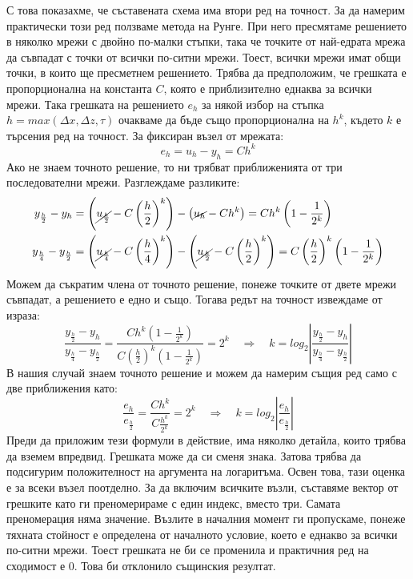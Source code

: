\documentclass[12pt]{article}
\numberwithin{equation}{section}
\begin{document}
С това показахме, че съставената схема има втори ред на точност. За да намерим практически този ред ползваме метода на Рунге. При него пресмятаме решението в няколко мрежи с двойно по-малки стъпки, така че точките от най-едрата мрежа да съвпадат с точки от всички по-ситни мрежи. Тоест, всички мрежи имат общи точки, в които ще пресметнем решението. Трябва да предположим, че грешката е пропорционална на константа $C$, която е приблизително еднаква за всички мрежи. Така грешката на решението $e_h$ за някой избор на стъпка $h = max(\Delta x, \Delta z, \tau)$ очакваме да бъде също пропорционална на $h^k$, където $k$ е търсения ред на точност. За фиксиран възел от мрежата:
\begin{equation}
    e_h = u_h - y_h = Ch^k
\end{equation}
Ако не знаем точното решение, то ни трябват приближенията от три последователни мрежи. Разглеждаме разликите:
\begin{equation}
    \begin{aligned}
        y_{\frac{h}{2}} - y_h
        &= \left( \cancel{u_{\frac{h}{2}}} - C\left(\frac{h}{2}\right)^k \right) - \left( \cancel{u_h} - Ch^k \right)
        = Ch^k \left( 1 - \frac{1}{2^k} \right) \\
        y_{\frac{h}{4}} - y_{\frac{h}{2}}
        &= \left( \cancel{u_{\frac{h}{4}}} - C\left(\frac{h}{4}\right)^k \right) - \left( \cancel{u_{\frac{h}{2}}} - C\left(\frac{h}{2}\right)^k \right)
        = C\left(\frac{h}{2}\right)^k \left( 1 - \frac{1}{2^k} \right)
    \end{aligned}
\end{equation}
Можем да съкратим члена от точното решение, понеже точките от двете мрежи съвпадат, а решението е едно и също. Тогава редът на точност извеждаме от израза:
\begin{equation}
    \frac{y_{\frac{h}{2}} - y_h}{y_{\frac{h}{4}} - y_{\frac{h}{2}}}
    = \frac{Ch^k\left( 1 - \frac{1}{2^k} \right)}{C\left(\frac{h}{2}\right)^k \left( 1 - \frac{1}{2^k} \right)}
    = 2^k
    \quad\Rightarrow\quad
    k = log_2\left\vert \frac{y_{\frac{h}{2}} - y_h}{y_{\frac{h}{4}} - y_{\frac{h}{2}}} \right\vert
\end{equation}
В нашия случай знаем точното решение и можем да намерим същия ред само с две приближения като:
\begin{equation}
    \frac{e_h}{e_{\frac{h}{2}}} = \frac{Ch^k}{C\frac{h^k}{2^k}} = 2^k
    \quad\Rightarrow\quad
    k = log_2\left\vert \frac{e_h}{e_{\frac{h}{2}}} \right\vert
\end{equation}
Преди да приложим тези формули в действие, има няколко детайла, които трябва да вземем впредвид. Грешката може да си сменя знака. Затова трябва да подсигурим положителност на аргумента на логаритъма.
Освен това, тази оценка е за всеки възел поотделно. За да включим всичките възли, съставяме вектор от грешките като ги преномерираме с един индекс, вместо три. Самата преномерация няма значение. Възлите в началния момент ги пропускаме, понеже тяхната стойност е определена от началното условие, което е еднакво за всички по-ситни мрежи. Тоест грешката не би се променила и практичния ред на сходимост е 0. Това би отклонило същинския резултат.
\end{document}
